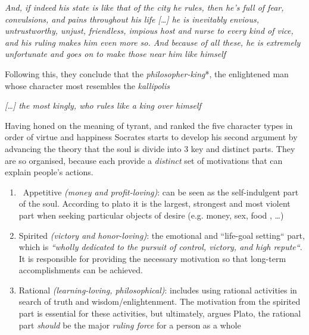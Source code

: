 \documentclass[english,course]{Notes}
\newcommand{\ita}[1]{\textit{#1}}
\newcommand\quo[1]{\begin{displayquote}\ita{\large{#1}}\end{displayquote}}
\begin{document}
\quo{And, if indeed his state is like that of the city he rules, then he's full of fear, convulsions, and pains throughout his life [\dots] he is inevitably envious, untrustworthy, unjust, friendless, impious host and nurse to every kind of vice, and his ruling makes him even more so. And because of all these, he is extremely unfortunate and goes on to make those near him like himself}

\par{Following this, they conclude that the \ita{philosopher-king}*, the enlightened man whose character most resembles the \ita{kallipolis}~}

\quo{[\dots] the most kingly, who rules like a king over himself}

\newpage
\par{Having honed on the meaning of tyrant, and ranked the five character types in order of virtue and happiness Socrates starts to develop his second argument by advancing the theory that the soul is divide into 3 key and distinct parts. They are so organised, because each provide a \ita{distinct} set of motivations that can explain people's actions.}

\begin{enumerate}
    \item ~Appetitive \ita{(money and profit-loving)}: can be seen as the self-indulgent part of the soul. According to plato it is the largest, strongest and most violent part when seeking particular objects of desire (e.g. money, sex, food , \dots)
    \item Spirited \ita{(victory and honor-loving)}: the emotional and ``life-goal setting`` part, which is \ita{``wholly dedicated to the pursuit of control, victory, and high repute``}. It is responsible for providing the necessary motivation so that long-term accomplishments can be achieved.
    \item Rational \ita{(learning-loving, philosophical)}: includes using rational activities in search of truth and wisdom/enlightenment. The motivation from the spirited part is essential for these activities, but ultimately, argues Plato, the rational part \ita{should} be the major \ita{ruling force} for a person as a whole
\end{enumerate}
\end{document}
